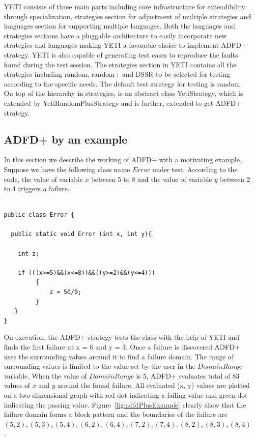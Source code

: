 YETI consists of three main parts including core infrastructure for extendibility through specialization, strategies section for adjustment of multiple strategies and 
languages section for supporting multiple languages. Both the languages and strategies sections have a pluggable architecture to easily incorporate new strategies and 
languages making YETI a favorable choice to implement ADFD+ strategy. YETI is also capable of generating test cases to reproduce the faults found during the test session. 
The strategies section in YETI contains all the strategies including random, random+ and DSSR to be selected for testing according to the specific needs. The default test 
strategy for testing is random. On top of the hierarchy in strategies, is an abstract class YetiStrategy, which is extended by YetiRandomPlusStrategy and is further, extended to get 
ADFD+ strategy.


\subsection{ADFD+ by an example}
In this section we describe the working of ADFD+ with a motivating example. Suppose we have the following class name $Error$ under test. According to the code, the value of variable $x$ between 5 to 8 and the value of variable $y$ between 2 to 4 triggers a failure.   

\begin{lstlisting}

public class Error {

  public static void Error (int x, int y){

    int z;

    if (((x>=5)&&(x<=8))&&((y>=2)&&(y<=4)))
		 {
			 z = 50/0;
		 }
   } 
}
\end{lstlisting}

On execution, the ADFD+ strategy tests the class with the help of YETI and finds the first failure at x = 6 and y = 3. Once a failure is discovered ADFD+ uses the surrounding values around it to find a failure domain. The range of surrounding values is limited to the value set by the user in the $Domain Range$ variable. When the value of $Domain Range$ is 5, ADFD+ evaluates total of 83 values of $x$ and $y$ around the found failure. All evaluated (x, y) values are plotted on a two dimensional graph with red dot indicating a failing value and green dot indicating the passing value. Figure~\ref{fig:adfdPlusExample} clearly show that the failure domain forms a block pattern and the boundaries of the failure are $(5, 2), (5, 3),(5, 4), (6, 2), (6, 4), (7, 2), (7, 4), (8, 2), (8, 3), (8, 4)$.

